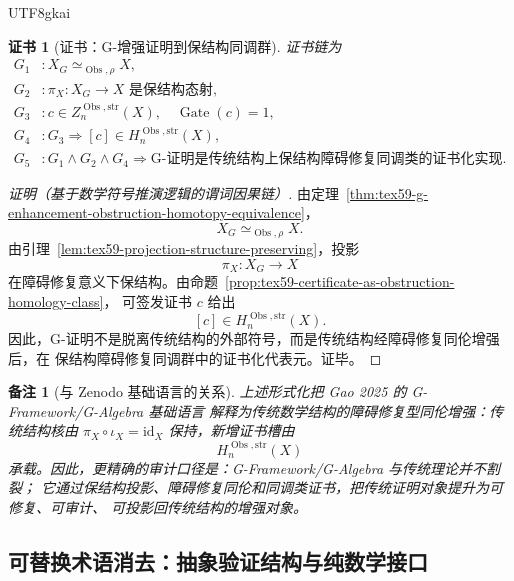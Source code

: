 \documentclass[12pt]{article}
\newtheorem{remark}{备注}[section]
\newtheorem{Certificate}{证书}[section]
\newcommand{\GFramework}{\textsf{G-Framework}}
\newcommand{\GAlgebra}{\textsf{G-Algebra}}
\newcommand{\id}{\mathrm{id}}
\DeclareMathOperator{\Gate}{Gate}
\DeclareMathOperator{\Obs}{Obs}
\begin{document}
\begin{CJK*}{UTF8}{gkai}
\begin{Certificate}[证书：G-增强证明到保结构同调群]
\label{cert:tex59-g-proof-structure-preserving-homology}
证书链为
\[
\begin{aligned}
  G_1 &: X_G\simeq_{\Obs,\rho}X,\\
  G_2 &: \pi_X:X_G\to X\text{ 是保结构态射},\\
  G_3 &: c\in Z_n^{\Obs,\mathrm{str}}(X),\quad \Gate(c)=1,\\
  G_4 &: G_3\Rightarrow [c]\in H_n^{\Obs,\mathrm{str}}(X),\\
  G_5 &: G_1\wedge G_2\wedge G_4
         \Rightarrow
         \text{G-证明是传统结构上保结构障碍修复同调类的证书化实现}.
\end{aligned}
\]
\end{Certificate}

\begin{proof}[证明（基于数学符号推演逻辑的谓词因果链）]
由定理~\ref{thm:tex59-g-enhancement-obstruction-homotopy-equivalence}，
\[
  X_G\simeq_{\Obs,\rho}X.
\]
由引理~\ref{lem:tex59-projection-structure-preserving}，投影
\[
  \pi_X:X_G\to X
\]
在障碍修复意义下保结构。由命题~\ref{prop:tex59-certificate-as-obstruction-homology-class}，
可签发证书 \(c\) 给出
\[
  [c]\in H_n^{\Obs,\mathrm{str}}(X).
\]
因此，G-证明不是脱离传统结构的外部符号，而是传统结构经障碍修复同伦增强后，在
保结构障碍修复同调群中的证书化代表元。证毕。
\end{proof}

\begin{remark}[与 Zenodo 基础语言的关系]
上述形式化把 Gao 2025 的 \GFramework{}/\GAlgebra{} 基础语言 \cite{Gao2025PureMathZenodo}
解释为传统数学结构的障碍修复型同伦增强：传统结构核由
\(\pi_X\circ\iota_X=\id_X\) 保持，新增证书槽由
\[
  H_n^{\Obs,\mathrm{str}}(X)
\]
承载。因此，更精确的审计口径是：G-Framework/G-Algebra 与传统理论并不割裂；
它通过保结构投影、障碍修复同伦和同调类证书，把传统证明对象提升为可修复、可审计、
可投影回传统结构的增强对象。
\end{remark}

\subsection{可替换术语消去：抽象验证结构与纯数学接口}
\label{subsec:tex59-implementation-name-abstraction}


\end{CJK*}
\end{document}
